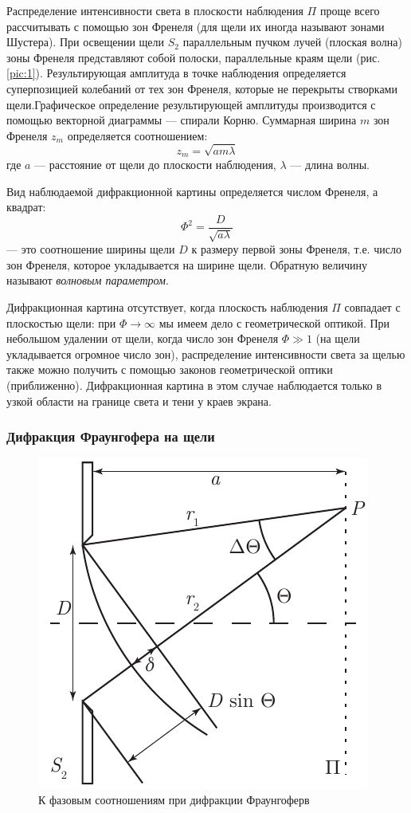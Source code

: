 \documentclass[a4paper, 12pt]{article}
\begin{document}
	Распределение интенсивности света в плоскости наблюдения $\Pi$ проще всего рассчитывать с помощью зон Френеля (для щели их иногда называют зонами Шустера). При освещении щели $S_2$ параллельным пучком лучей (плоская волна) зоны Френеля представляют собой полоски, параллельные краям щели (рис. \ref{pic:1}). Результирующая амплитуда в точке наблюдения определяется суперпозицией колебаний от тех зон Френеля, которые не перекрыты створками щели.Графическое определение результирующей амплитуды производится с помощью векторной диаграммы — спирали Корню. Суммарная ширина $m$ зон Френеля $z_m$ определяется соотношением:
	\begin{equation*}
		z_m=\sqrt{am\lambda}
	\end{equation*}
	где $a$ — расстояние от щели до плоскости наблюдения, $\lambda$ — длина волны.\par
	Вид наблюдаемой дифракционной картины определяется числом Френеля, а квадрат:
	\begin{equation}
		\Phi^2=\frac{D}{\sqrt{a\lambda}}
	\end{equation}
	— это соотношение ширины щели $D$ к размеру первой зоны Френеля, т.е. число зон Френеля, которое укладывается на ширине щели. Обратную величину называют \textit{волновым параметром}.\par
	Дифракционная картина отсутствует, когда плоскость наблюдения $\Pi$ совпадает с плоскостью щели: при $\Phi\rightarrow\infty$ мы имеем дело с геометрической оптикой. При небольшом удалении от щели, когда число зон Френеля $\Phi\gg 1$ (на щели укладывается огромное число зон), распределение интенсивности света за щелью также можно получить с помощью законов геометрической оптики (приближенно). Дифракционная картина в этом случае наблюдается только в узкой области на границе света и тени у краев экрана.
	\subsubsection{Дифракция Фраунгофера на щели}
	\begin{figure}
		\includegraphics[scale=0.9]{Fig2.pdf}
		\caption{К фазовым соотношениям при дифракции Фраунгоферв}
		\label{pic:2}
	\end{figure}
\end{document}

